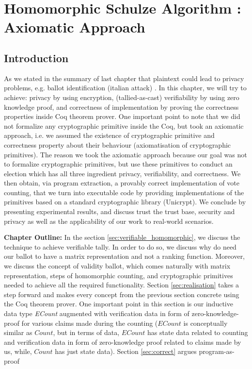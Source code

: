 \chapter{Homomorphic Schulze Algorithm : Axiomatic Approach}
\label{cha:homormorphic_schulze}

\section{Introduction}
As we stated in the  summary of last chapter that plaintext could lead to 
privacy problems, e.g. ballot identification (italian attack) \cite{Otten}. 
In this chapter, we will try to achieve: privacy by using encryption, (tallied-as-cast) 
verifiability by using zero knowledge proof, and correctness of implementation 
by proving the correctness properties inside Coq theorem prover. 
One important point to note that we did not formalize any cryptographic primitive inside the Coq, but 
took an axiomatic approach, i.e. we assumed the existence of cryptographic 
primitive and correctness property about their behaviour (axiomatisation of 
cryptographic primitives). The reason we took the axiomatic approach 
because our goal was not to formalize cryptographic primitives, but use these primitives
to conduct an election which has all three ingredient privacy, verifiability, 
and correctness. We then obtain, via program extraction, a
provably correct implementation of vote counting, that we turn
into executable code by providing implementations of the primitives
based on a standard cryptographic library (Unicrypt). 
We conclude by presenting
experimental results, and discuss trust the trust base, security and
privacy as well as the applicability of our work to real-world
scenarios. 




\textbf{Chapter Outline:} In the section \ref{sec:verifiable_homomorphic}, 
we discuss the technique to achieve verifiable tally. In order to do so, 
we discuss why do need our ballot to have a matrix representation 
and not a ranking function. Moreover, we discuss the concept 
of validity ballot, which comes naturally with matrix representation, 
steps of homomorphic counting, and cryptographic primitives needed 
to achieve all the required functionality. Section \ref{sec:realisation} 
takes a step forward and makes every concept from the previous section
concrete using the Coq theorem prover. One important point 
in this section is our inductive data type \textit{ECount}
augmented with verification data in form of zero-knowledge-proof 
for various claims made during the counting 
($ECount$ is conceptually similar as $Count$, but 
in terms of data, $ECount$ has state data related to counting and verification data
in form of zero-knowledge proof related to claims made by us, while, $Count$ 
has just state data).  Section \ref{sec:correct} argues 
program-as-proof 


